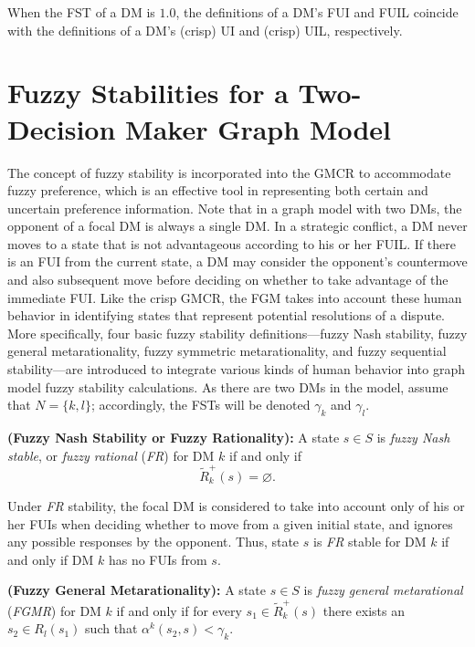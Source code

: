 \begin{remark}\label{rmk-fui-dm}
\rm When the FST of a DM is $1.0$, the definitions of a DM's FUI and FUIL coincide with the definitions of a DM's (crisp) UI and (crisp) UIL, respectively.
\end{remark}

\section{Fuzzy Stabilities for a Two-Decision Maker Graph Model}\label{sec-fuz-stabl-2dm}

The concept of fuzzy stability is incorporated into the GMCR to accommodate fuzzy preference, which is an effective tool in representing both certain and uncertain preference information. Note that in a graph model with two DMs, the opponent of a focal DM is always a single DM. In a strategic conflict, a DM never moves to a state that is not advantageous according to his or her FUIL. If there is an FUI from the current state, a DM may consider the opponent's countermove and also subsequent move before deciding on whether to take advantage of the immediate FUI. Like the crisp GMCR, the FGM takes into account these human behavior in identifying states that represent potential resolutions of a dispute. More specifically, four basic fuzzy stability definitions---fuzzy Nash stability, fuzzy general metarationality, fuzzy symmetric metarationality, and fuzzy sequential stability---are introduced to integrate various kinds of human behavior into graph model fuzzy stability calculations. As there are two DMs in the model, assume that $N=\{k, l\}$; accordingly, the FSTs will be denoted $\gamma_k$ and $\gamma_l$.

\begin{definition}\label{def-fr}
\rm {\bf (Fuzzy Nash Stability or Fuzzy Rationality):}
A state $s \in S$ is \emph{fuzzy Nash stable}, or \emph{fuzzy rational} (\emph{FR}) for DM $k$ if and only if
$$\widetilde{R}_k^+(s)=\varnothing.$$
\end{definition}

\noindent Under \emph{FR} stability, the focal DM is considered to take into account only of his or her FUIs when deciding whether to move from a given initial state, and ignores any possible responses by the opponent. Thus, state $s$ is \emph{FR} stable for DM $k$ if and only if DM $k$ has no FUIs from $s$.

\begin{definition}
\rm {\bf (Fuzzy General Metarationality):}\label{def-fgmr-2dm}
A state $s \in S$ is \emph{fuzzy general metarational} (\emph{FGMR}) for DM $k$ if and only if for every $s_1 \in \widetilde{R}_k^+(s)$ there exists an $s_2 \in R_l(s_1)$ such that $\alpha^k(s_2, s)<\gamma_k$.
\end{definition}

